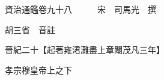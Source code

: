 










 


 
 


 

  
  
  
  
  





  
  
  
  
  
 
  

  

  
  
  



  

 
 

  
   




  

  
  


  　　資治通鑑卷九十八　　　宋　司馬光　撰

　　胡三省　音註

　　晉紀二十【起著雍涒灘盡上章閹茂凡三年】

　　孝宗穆皇帝上之下

